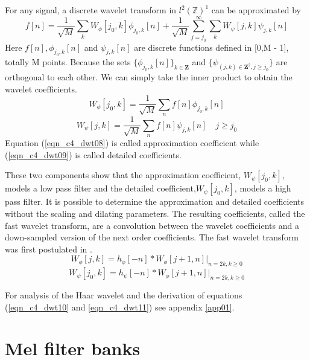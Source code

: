 For any signal, a discrete wavelet transform in $l^2(\mathbb{Z})^1$ can be approximated by
\begin{equation}
f[n]=\frac{1}{\sqrt{M}}\sum_kW_\phi[j_0,k]\phi_{j_0,k}[n]+\frac{1}{\sqrt{M}}\sum_{j=j_0}^\infty\sum_kW_\psi[j,k]\psi_{j,k}[n]
\label{eqn_c4_dwt07}
\end{equation}
Here $f[n],\phi_{j_0,k}[n]$ and $\psi_{j,k}[n]$ are discrete functions defined in [0,M - 1], totally M points.  Because the sets $\{\phi_{j_0,k}[n]\}_{k\in\mathbf{Z}}$ and $\{\psi_{(j,k)\in\mathbf{Z}^2,j\ge j_0}\}$ are orthogonal to each other.  We can simply take the inner product to obtain the wavelet coefficients.
\begin{equation}
W_\phi[j_0,k]=\frac{1}{\sqrt{M}}\sum_nf[n]\phi_{j_0,k}[n]
\label{eqn_c4_dwt08}
\end{equation}
\begin{equation}
W_\psi[j,k]=\frac{1}{\sqrt{M}}\sum_nf[n]\psi_{j,k}[n] \quad j\ge j_0
\label{eqn_c4_dwt09}
\end{equation}
Equation (\ref{eqn_c4_dwt08}) is called approximation coefficient while (\ref{eqn_c4_dwt09}) is called detailed coefficients.

These two components show that the approximation coefficient, $W_\psi[j_0,k]$, models a low pass filter and the detailed coefficient,$W_\psi[j_0,k]$, models a high pass filter. It is possible to determine the approximation and detailed coefficients without the scaling and dilating parameters. The resulting coefficients, called the fast wavelet transform, are a convolution between the wavelet coefficients and a down-sampled version of the next order coefficients.  The fast wavelet transform was first postulated in \citep{mallat1989theory}.
\begin{equation}
W_\phi[j,k]=h_\phi[-n]\ast W_\phi[j+1,n]|_{n=2k, k\ge 0}
\label{eqn_c4_dwt10}
\end{equation}
\begin{equation}
W_\psi[j_0,k]=h_\psi[-n]\ast W_\phi[j+1,n]|_{n=2k, k\ge 0}
\label{eqn_c4_dwt11}
\end{equation}

For analysis of the Haar wavelet and the derivation of equations (\ref{eqn_c4_dwt10} and \ref{eqn_c4_dwt11}) see appendix \ref{app01}.

\section{Mel filter banks}

